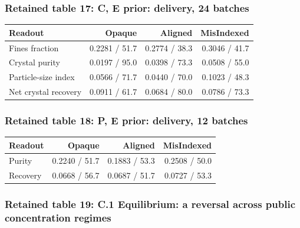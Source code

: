 \documentclass[10pt,a4paper]{article}
\begin{document}
\subsubsection{Retained table 17: C, E prior: delivery, 24 batches}\label{retained-table-17-c-e-prior-delivery-24-batches}

{\def\LTcaptype{table} %
\small\begin{longtable}[]{@{}lrrr@{}}
\toprule\noalign{}
Readout & Opaque & Aligned & MisIndexed \\
\midrule\noalign{}
\endhead
\bottomrule\noalign{}
\endlastfoot
Fines fraction & 0.2281 / 51.7 & 0.2774 / 38.3 & 0.3046 / 41.7 \\
Crystal purity & 0.0197 / 95.0 & 0.0398 / 73.3 & 0.0508 / 55.0 \\
Particle-size index & 0.0566 / 71.7 & 0.0440 / 70.0 & 0.1023 / 48.3 \\
Net crystal recovery & 0.0911 / 61.7 & 0.0684 / 80.0 & 0.0786 / 73.3 \\
\end{longtable}\normalsize
}

\subsubsection{Retained table 18: P, E prior: delivery, 12 batches}\label{retained-table-18-p-e-prior-delivery-12-batches}

{\def\LTcaptype{table} %
\small\begin{longtable}[]{@{}lrrr@{}}
\toprule\noalign{}
Readout & Opaque & Aligned & MisIndexed \\
\midrule\noalign{}
\endhead
\bottomrule\noalign{}
\endlastfoot
Purity & 0.2240 / 51.7 & 0.1883 / 53.3 & 0.2508 / 50.0 \\
Recovery & 0.0668 / 56.7 & 0.0687 / 51.7 & 0.0727 / 53.3 \\
\end{longtable}\normalsize
}

\subsubsection{Retained table 19: C.1 Equilibrium: a reversal across public concentration regimes}\label{retained-table-19-c.1-equilibrium-a-reversal-across-public-concentration-regimes}
\end{document}
